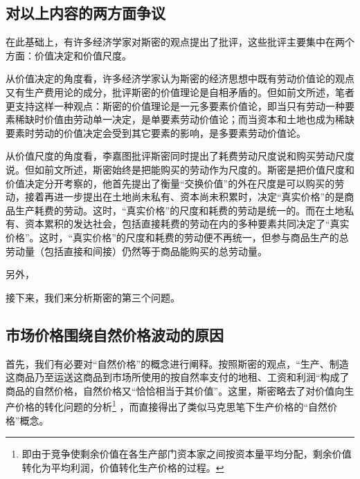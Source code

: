 \subsection{对以上内容的两方面争议}

在此基础上，有许多经济学家对斯密的观点提出了批评，这些批评主要集中在两个方面：价值决定和价值尺度。

从价值决定的角度看，许多经济学家认为斯密的经济思想中既有劳动价值论的观点又有生产费用论的成分，批评斯密的价值理论是自相矛盾的\cite[136]{CaiJiMingCongGuDianZhengZhiJingJiXueDaoZhongGuoTeSeSheHuiZhuYiZhengZhiJingJiXueJiYuZhongGuoShiJiaoDeZhengZhiJingJiXueYanBianShangCe2023}\cite[294]{YueSeFu*XiongBiTeJingJiFenXiShiDi1Juan2017}。但如前文所述，笔者更支持这样一种观点：斯密的价值理论是一元多要素价值论\cite[136]{CaiJiMingCongGuDianZhengZhiJingJiXueDaoZhongGuoTeSeSheHuiZhuYiZhengZhiJingJiXueJiYuZhongGuoShiJiaoDeZhengZhiJingJiXueYanBianShangCe2023}，即当只有劳动一种要素稀缺时价值由劳动单一决定，是单要素劳动价值论；而当资本和土地也成为稀缺要素时劳动的价值决定会受到其它要素的影响，是多要素劳动价值论。

从价值尺度的角度看，李嘉图批评斯密同时提出了耗费劳动尺度说和购买劳动尺度说\cite[7]{DaWei*LiJiaTuZhengZhiJingJiXueJiFuShuiYuanLi2021}。但如前文所述，斯密始终是把能购买的劳动作为尺度的\cite[142]{CaiJiMingCongGuDianZhengZhiJingJiXueDaoZhongGuoTeSeSheHuiZhuYiZhengZhiJingJiXueJiYuZhongGuoShiJiaoDeZhengZhiJingJiXueYanBianShangCe2023}。斯密是把价值尺度和价值决定分开考察的\cite[73]{ChenDaiSunCongGuDianJingJiXuePaiDaoMaKeSiRuoGanZhuYaoXueShuoFaZhanLueLun2014}，他首先提出了衡量“交换价值”的外在尺度是可以购买的劳动，接着再进一步提出在土地尚未私有、资本尚未积累时，决定“真实价格”的是商品生产耗费的劳动。这时，“真实价格”的尺度和耗费的劳动是统一的。而在土地私有、资本累积的发达社会，包括直接耗费的劳动在内的多种要素共同决定了“真实价格”。这时，“真实价格”的尺度和耗费的劳动便不再统一，但参与商品生产的总劳动量（包括直接和间接）仍然等于商品能购买的总劳动量。

另外，

接下来，我们来分析斯密的第三个问题。

\subsection{市场价格围绕自然价格波动的原因}

首先，我们有必要对“自然价格”的概念进行阐释。按照斯密的观点，“生产、制造这商品乃至运送这商品到市场所使用的按自然率支付的地租、工资和利润“构成了商品的自然价格，自然价格又“恰恰相当于其价值”\cite[49]{YaDang*SiMiGuoFuLun2015}。这里，斯密略去了对价值向生产价格的转化问题的分析\footnote{即由于竞争使剩余价值在各生产部门资本家之间按资本量平均分配，剩余价值转化为平均利润，价值转化生产价格的过程\cite{XieFuShengXiFangXueZheGuanYuMaKeSiJieZhiZhuanXingLiLunYanJiuShuPing2000}。}
，而直接得出了类似马克思笔下生产价格的“自然价格”概念。

